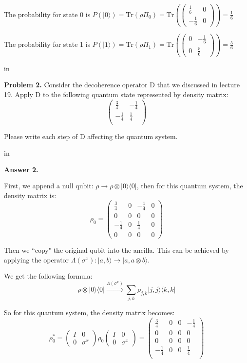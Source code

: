 \documentclass[11pt]{article}
\begin{document}
The probability for state 0 is $P(|0\rangle)=\text{Tr}(\rho\Pi_0)=\text{Tr}(\begin{pmatrix}
	\frac{1}{6}&0\\
	-\frac{1}{6}&0
\end{pmatrix})=\frac{1}{6}$

The probability for state 1 is $P(|1\rangle)=\text{Tr}(\rho\Pi_1)=\text{Tr}(\begin{pmatrix}
	0&-\frac{1}{6}\\
	0&\frac{5}{6}
\end{pmatrix})=\frac{5}{6}$


 in

{\bf Problem 2.} Consider the decoherence operator D that we discussed in lecture 19. Apply D to the following quantum state represented by density matrix:
$$
\begin{pmatrix}
	\frac{3}{4}&-\frac{1}{4}\\
	-\frac{1}{4}&\frac{1}{4}\\
\end{pmatrix}
$$

Please write each step of D affecting the quantum system.

 in

{\bf Answer 2.} 

First, we append a null qubit: $\rho\to\rho\otimes |0\rangle\langle0|$, then for this quantum system, the density matrix is:
$$
\rho_0=\begin{pmatrix}
\frac{3}{4}&0&-\frac{1}{4}&0\\
0&0&0&0\\
-\frac{1}{4}&0&\frac{1}{4}&0\\
0&0&0&0
\end{pmatrix}
$$

Then we ``copy" the original qubit into the ancilla. This can be achieved by applying
the operator $\Lambda(\sigma^x):|a,b\rangle\to|a,a\otimes b\rangle$. 

We get the following formula:
$$
\rho\otimes |0\rangle\langle0|\stackrel{\Lambda(\sigma^x)}{\longrightarrow}\sum_{j,k}\rho_{j,k}|j,j\rangle\langle k,k|
$$

So for this quantum system, the density matrix becomes:
$$
\rho_0^{*}=\begin{pmatrix}
	I&0\\
	0&\sigma^x
\end{pmatrix}\rho_0\begin{pmatrix}
I&0\\
0&\sigma^x
\end{pmatrix}=\begin{pmatrix}
\frac{3}{4}&0&0&-\frac{1}{4}\\
0&0&0&0\\
0&0&0&0\\
-\frac{1}{4}&0&0&\frac{1}{4}\\
\end{pmatrix}
$$
\end{document}
